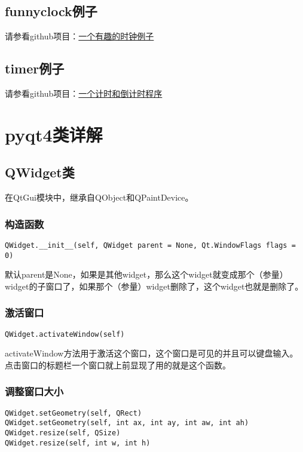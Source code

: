 \documentclass[12pt,oneside]{book}
\begin{document}
\begin{common-format}
\section{funnyclock例子}
请参看github项目：\href{https://github.com/a358003542/funnyclock}{一个有趣的时钟例子}


\section{timer例子}
请参看github项目：\href{https://github.com/a358003542/timer}{一个计时和倒计时程序}



\chapter{pyqt4类详解}
\section{QWidget类}
在QtGui模块中，继承自QObject和QPaintDevice。

\subsection{构造函数}
\begin{Verbatim}
QWidget.__init__(self, QWidget parent = None, Qt.WindowFlags flags = 0)
\end{Verbatim}

默认parent是None，如果是其他widget，那么这个widget就变成那个（参量）widget的子窗口了，如果那个（参量）widget删除了，这个widget也就是删除了。

\subsection{激活窗口}
\begin{Verbatim}
QWidget.activateWindow(self)
\end{Verbatim}
activateWindow方法用于激活这个窗口，这个窗口是可见的并且可以键盘输入。点击窗口的标题栏一个窗口就上前显现了用的就是这个函数。

\subsection{调整窗口大小}
\begin{Verbatim}
QWidget.setGeometry(self, QRect)
QWidget.setGeometry(self, int ax, int ay, int aw, int ah)
QWidget.resize(self, QSize)
QWidget.resize(self, int w, int h)
\end{Verbatim}


\end{common-format}
\end{document}

